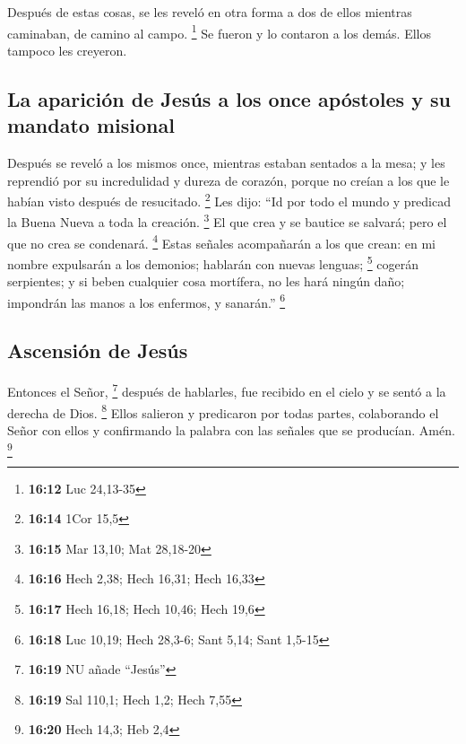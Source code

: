  Después de estas cosas, se les reveló en otra forma a
dos de ellos mientras caminaban, de camino al campo. \footnote{\textbf{16:12}
  Luc 24,13-35}  Se fueron y lo contaron a los demás.
Ellos tampoco les creyeron.

\hypertarget{la-apariciuxf3n-de-jesuxfas-a-los-once-apuxf3stoles-y-su-mandato-misional}{%
\subsection{La aparición de Jesús a los once apóstoles y su mandato
misional}\label{la-apariciuxf3n-de-jesuxfas-a-los-once-apuxf3stoles-y-su-mandato-misional}}

 Después se reveló a los mismos once, mientras estaban
sentados a la mesa; y les reprendió por su incredulidad y dureza de
corazón, porque no creían a los que le habían visto después de
resucitado. \footnote{\textbf{16:14} 1Cor 15,5}  Les
dijo: ``Id por todo el mundo y predicad la Buena Nueva a toda la
creación. \footnote{\textbf{16:15} Mar 13,10; Mat 28,18-20}
 El que crea y se bautice se salvará; pero el que no crea
se condenará. \footnote{\textbf{16:16} Hech 2,38; Hech 16,31; Hech 16,33}
 Estas señales acompañarán a los que crean: en mi nombre
expulsarán a los demonios; hablarán con nuevas lenguas; \footnote{\textbf{16:17}
  Hech 16,18; Hech 10,46; Hech 19,6}  cogerán serpientes;
y si beben cualquier cosa mortífera, no les hará ningún daño; impondrán
las manos a los enfermos, y sanarán.'' \footnote{\textbf{16:18} Luc
  10,19; Hech 28,3-6; Sant 5,14; Sant 1,5-15}

\hypertarget{ascensiuxf3n-de-jesuxfas}{%
\subsection{Ascensión de Jesús}\label{ascensiuxf3n-de-jesuxfas}}

 Entonces el Señor, \footnote{\textbf{16:19} NU añade
  ``Jesús''} después de hablarles, fue recibido en el cielo y se sentó a
la derecha de Dios. \footnote{\textbf{16:19} Sal 110,1; Hech 1,2; Hech
  7,55}  Ellos salieron y predicaron por todas partes,
colaborando el Señor con ellos y confirmando la palabra con las señales
que se producían. Amén. \footnote{\textbf{16:20} Hech 14,3; Heb 2,4}
